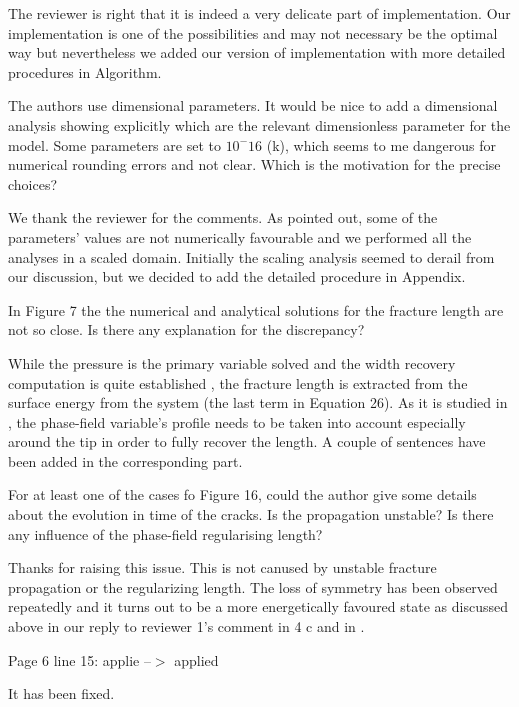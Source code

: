 \documentclass{article}
\newcommand{\KYCom}[1]{\textcolor{red!55!blue}{#1}}
\begin{document}
\KYCom{The reviewer is right that it is indeed a very delicate part of implementation. Our implementation is one of the possibilities and may not necessary be the optimal way but nevertheless we added our version of implementation with more detailed procedures in Algorithm.}

The authors use dimensional parameters. It would be nice to add a dimensional analysis showing explicitly which are the relevant dimensionless parameter for the model. Some parameters are set to $10^-16$ (k), which seems to me dangerous for numerical rounding errors and not clear. Which is the motivation for the precise choices? 

\KYCom{We thank the reviewer for the comments. As pointed out, some of the parameters' values are not numerically favourable and we performed all the analyses in a scaled domain. Initially the scaling analysis seemed to derail from our discussion, but we decided to add the detailed procedure in Appendix.}

In Figure 7 the the numerical and analytical solutions for the fracture length are not so close. Is there any explanation for the discrepancy?

\KYCom{While the pressure is the primary variable solved and the width recovery computation is quite established \cite{chuks}, the fracture length is extracted from the surface energy from the system (the last term in Equation 26). As it is studied in \cite{Tanne-2017a}, the phase-field variable's profile needs to be taken into account especially around the tip in order to fully recover the length. A couple of sentences have been added in the corresponding part.}

For at least one of the cases fo Figure 16, could the author give some details about the evolution in time of the cracks. Is the propagation unstable? Is there any influence of the phase-field regularising length?

\KYCom{Thanks for raising this issue. This is not canused by unstable fracture propagation or the regularizing length. The loss of symmetry has been observed repeatedly and it turns out to be a more energetically favoured state as discussed above in our reply to reviewer 1's comment in 4 c and in \cite{Tanne-2017a}.}

Page 6 line 15: applie --$>$ applied

\KYCom{It has been fixed.}



\end{document}
